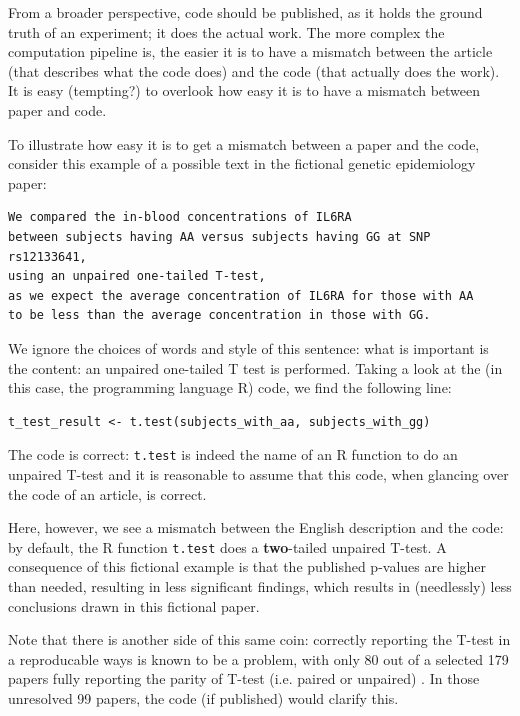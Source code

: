 From a broader perspective, code should be published, as it holds the
ground truth of an experiment; it does the actual work.
The more complex the computation pipeline is, the easier it is
to have a mismatch between the article (that describes what the
code does) and the code (that actually does the work).
It is easy (tempting?) to overlook how easy it is to have a mismatch
between paper and code.

To illustrate how easy it is to get a mismatch between a paper
and the code, 
consider this example of a possible text in the fictional 
genetic epidemiology paper:

\begin{verbatim}
We compared the in-blood concentrations of IL6RA 
between subjects having AA versus subjects having GG at SNP rs12133641,
using an unpaired one-tailed T-test,
as we expect the average concentration of IL6RA for those with AA 
to be less than the average concentration in those with GG.
\end{verbatim}

We ignore the choices of words and style of this sentence: what is
important is the content: an unpaired one-tailed T test is performed.
Taking a look at the (in this case, the programming language R) code, 
we find the following line:

\begin{verbatim}
t_test_result <- t.test(subjects_with_aa, subjects_with_gg)
\end{verbatim}

The code is correct:
\verb|t.test| is indeed the name of an R function to do an unpaired T-test
and it is reasonable to assume that this code, when glancing over the code
of an article, is correct.

Here, however, we see a mismatch between the English description and the code:
by default, the R function \verb|t.test| does 
a \textbf{two}-tailed unpaired T-test.
A consequence of this fictional example is that the published p-values are
higher than needed, resulting in less significant findings, which
results in (needlessly) less conclusions drawn in this fictional paper.

Note that there is another side of this same coin:
correctly reporting the T-test in a reproducable ways
is known to be a problem, with only 80 out of a selected 179 papers
fully reporting the parity of T-test (i.e. paired or unpaired) 
\cite{weissgerber2018we}.
In those unresolved 99 papers, 
the code (if published) would clarify this.

